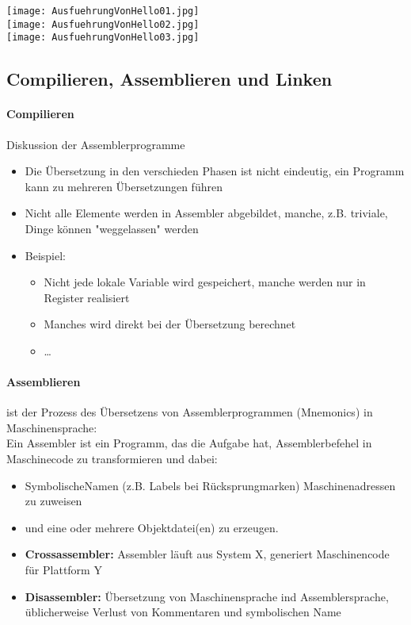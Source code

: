 		\begin{center}
			\texttt{[image: AusfuehrungVonHello01.jpg]} \\
			\texttt{[image: AusfuehrungVonHello02.jpg]} \\
			\texttt{[image: AusfuehrungVonHello03.jpg]}
		\end{center}


	\subsection{Compilieren, Assemblieren und Linken}
		\paragraph{Compilieren} Diskussion der Assemblerprogramme
		\begin{itemize}
			\item Die Übersetzung in den verschieden Phasen ist nicht eindeutig,
				ein Programm kann zu mehreren Übersetzungen führen
			\item Nicht alle Elemente werden in Assembler abgebildet, manche, z.B. triviale,
				Dinge können "weggelassen" werden
			\item Beispiel:
				\begin{itemize}
					\item Nicht jede lokale Variable wird gespeichert, manche werden nur in Register realisiert
					\item Manches wird direkt bei der Übersetzung berechnet
					\item \dots
				\end{itemize}
		\end{itemize}

		\paragraph{Assemblieren} ist der Prozess des Übersetzens von Assemblerprogrammen 
		(Mnemonics) in Maschinensprache: \\
		Ein Assembler ist ein Programm, das die Aufgabe hat, Assemblerbefehel in Maschinecode
		zu transformieren und dabei:
		\begin{itemize}
			\item SymbolischeNamen (z.B. Labels bei Rücksprungmarken) Maschinenadressen zu zuweisen
			\item und eine oder mehrere Objektdatei(en) zu erzeugen.
			\item \textbf{Crossassembler:} Assembler läuft aus System X, generiert Maschinencode für Plattform Y
			\item \textbf{Disassembler:} Übersetzung von Maschinensprache ind Assemblersprache,
				üblicherweise Verlust von Kommentaren und symbolischen Name \\
		\end{itemize}

